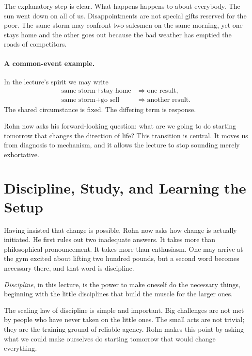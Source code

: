 The explanatory step is clear. What happens happens to about everybody. The sun went down on all of us. Disappointments are not special gifts reserved for the poor. The same storm may confront two salesmen on the same morning, yet one stays home and the other goes out because the bad weather has emptied the roads of competitors.

\paragraph{A common-event example.} In the lecture's spirit we may write
\begin{align}
\text{same storm} + \text{stay home} &\Rightarrow \text{one result},\\
\text{same storm} + \text{go sell} &\Rightarrow \text{another result}.
\end{align}
The shared circumstance is fixed. The differing term is response.

Rohn now asks his forward-looking question: what are we going to do starting tomorrow that changes the direction of life? This transition is central. It moves us from diagnosis to mechanism, and it allows the lecture to stop sounding merely exhortative.

\section{Discipline, Study, and Learning the Setup}

Having insisted that change is possible, Rohn now asks how change is actually initiated. He first rules out two inadequate answers. It takes more than philosophical pronouncement. It takes more than enthusiasm. One may arrive at the gym excited about lifting two hundred pounds, but a second word becomes necessary there, and that word is discipline.

\begin{definition}
\emph{Discipline}, in this lecture, is the power to make oneself do the necessary things, beginning with the little disciplines that build the muscle for the larger ones.
\end{definition}

The scaling law of discipline is simple and important. Big challenges are not met by people who have never taken on the little ones. The small acts are not trivial; they are the training ground of reliable agency. Rohn makes this point by asking what we could make ourselves do starting tomorrow that would change everything.


